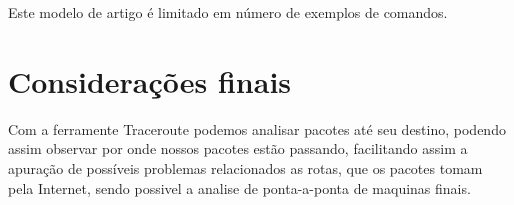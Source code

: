\documentclass[
	article,			%
	11pt,				%
	oneside,			%
	a4paper,			%
	section=TITLE,		%
	english,			%
	brazil,				%
	sumario=tradicional
	]{abntex2}
\begin{document}
Este modelo de artigo é limitado em número de exemplos de comandos.

% 

\section{Considerações finais}
  Com a ferramente Traceroute podemos analisar pacotes até seu destino, podendo assim observar por onde nossos pacotes estão passando, facilitando assim a apuração de possíveis problemas relacionados as rotas, que os pacotes tomam pela Internet, sendo possivel a analise de ponta-a-ponta de maquinas finais.


\end{document}
